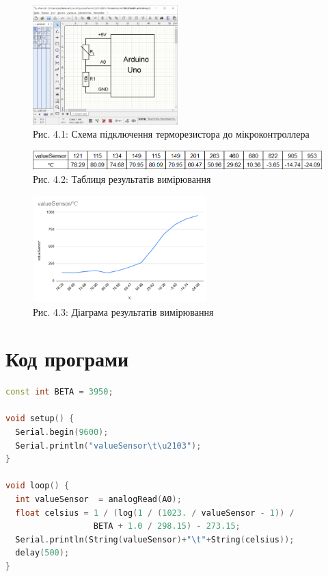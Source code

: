 \documentclass[a4paper]{article}
\begin{document}
\begin{figure}[h]
    \centering
    \includegraphics[width=0.5\textwidth]{imgs/LW4.1.png}
    \caption*{Рис. 4.1: Схема підключення терморезистора до мікроконтроллера}
\end{figure} 
\begin{figure}[h]
    \centering
    \includegraphics[width=1\textwidth]{imgs/LW4.2.png}
    \caption*{Рис. 4.2: Таблиця результатів вимірювання}
\end{figure} 
\begin{figure}[h]
    \centering
    \includegraphics[width=0.6\textwidth]{imgs/LW4.3.png}
    \caption*{Рис. 4.3: Діаграма результатів вимірювання}
\end{figure} 



\section*{Код програми}
\begin{lstlisting}[language=C++, caption=Програма для вимірювання температури]
const int BETA = 3950;

void setup() {
  Serial.begin(9600);
  Serial.println("valueSensor\t\u2103");
}

void loop() {
  int valueSensor  = analogRead(A0);
  float celsius = 1 / (log(1 / (1023. / valueSensor - 1)) /
                  BETA + 1.0 / 298.15) - 273.15;
  Serial.println(String(valueSensor)+"\t"+String(celsius));
  delay(500);
}
\end{lstlisting}
\end{document}
